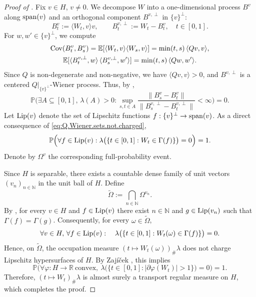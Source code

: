 \documentclass[a4paper]{amsart}
\numberwithin{theorem}{section}
\theoremstyle{definition}
\renewcommand{\phi}{\varphi}
\begin{document}
\begin{proof}[Proof of ]
    Fix $v \in H$, $v \neq 0$. 
    We decompose $W$ into a one-dimensional process $B^v$ along ${\rm span}(v)$ and an orthogonal component $B^{v,\perp}$ in $\{ v \}^\perp$: 
    \[
        B_t^v := \langle W_t, v \rangle v, 
        \qquad 
        B_t^{v,\perp} := W_t - B_t^v,
        \quad t \in [0,1].
    \]
    For $w, w' \in \{ v \}^\perp$, we compute
    \begin{gather*}
        {\rm Cov}(B_t^v, B_s^v) 
        = \mathbb E[ \langle W_t, v \rangle \langle W_s, v \rangle ] 
        = \min(t,s)\,\langle Qv, v \rangle,
        \\
        \mathbb E[ \langle B_t^{v,\perp}, w \rangle \, \langle B_s^{v,\perp}, w' \rangle ] 
        = \min(t,s)\,\langle Qw, w' \rangle.
    \end{gather*}
    Since $Q$ is non-degenerate and non-negative, we have $\langle Qv, v \rangle > 0$, and $B^{v,\perp}$ is a centered $Q|_{\{v\}^\perp}$-Wiener process. 
    Thus, by ,
    \begin{equation} \label{eq:Q.Wiener.sets.not.charged}
        \mathbb P \Big( \exists A \subseteq [0,1], \, \lambda(A) > 0 : 
        \sup_{s,t \in A} \frac{\|B_s^v - B_t^v\|}{\|B_s^{v,\perp} - B_t^{v,\perp}\|} < \infty \Big) = 0.
    \end{equation}
 Let ${\rm Lip}(v)$ denote the set of Lipschitz functions $f : \{ v \}^\perp \to {\rm span}(v)$.
    As a direct consequence of \eqref{eq:Q.Wiener.sets.not.charged}, 
    \[
        \mathbb P \Big( \forall f \in {\rm Lip}(v): \lambda\big( \{ t \in [0,1] : W_t \in \Gamma(f) \} \big) = 0 \Big) = 1.
    \]
    Denote by $\Omega^v$ the corresponding full-probability event.

    Since $H$ is separable, there exists a countable dense family of unit vectors $(v_n)_{n \in \mathbb N}$ in the unit ball of $H$. 
    Define
    \[
        \tilde \Omega := \bigcap_{n \in \mathbb N} \Omega^{v_n}.
    \]
    By , for every $v \in H$ and $f \in {\rm Lip}(v)$ there exist $n \in \mathbb N$ and $g \in {\rm Lip}(v_n)$ such that $\Gamma(f) = \Gamma(g)$. 
    Consequently, for every $\omega \in \tilde \Omega$,
    \[
        \forall v \in H, \, \forall f \in {\rm Lip}(v): 
        \quad \lambda\big( \{ t \in [0,1] : W_t(\omega) \in \Gamma(f) \} \big) = 0.
    \]
    Hence, on $\tilde \Omega$, the occupation measure $(t \mapsto W_t(\omega))_\# \lambda$ does not charge Lipschitz hypersurfaces of $H$. 
    By Zajíček \cite[Theorem 2]{Za}, this implies
    \[
        \mathbb P\Big( \forall \phi : H \to \mathbb R \ \text{convex}, \ 
        \lambda\big( \{ t \in [0,1] : |\partial \phi(W_t)| > 1 \} \big) = 0 \Big) = 1.
    \]
    Therefore, $(t \mapsto W_t)_\# \lambda$ is almost surely a transport regular measure on $H$, which completes the proof.
\end{proof}
\end{document}
